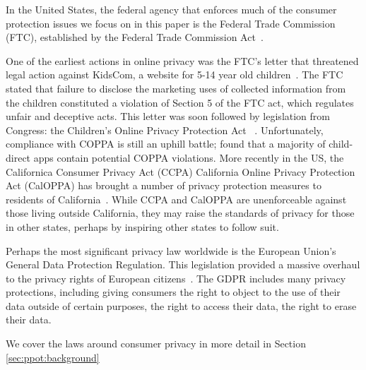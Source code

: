 In the United States, the federal agency that enforces much of the consumer protection issues we focus on in this paper is the Federal Trade Commission (FTC), established by the Federal Trade Commission Act~\cite{ftcact}.

One of the earliest actions in online privacy was the FTC's letter that threatened legal action against KidsCom, a website for 5-14 year old children~\cite{ftc1997principles}. The FTC stated that failure to disclose the marketing uses of collected information from the children constituted a violation of Section 5 of the FTC act, which regulates unfair and deceptive acts. This letter was soon followed by legislation from Congress: the Children's Online Privacy Protection Act ~\cite{coppa}. Unfortunately, compliance with COPPA is still an uphill battle; \citet{reyes2018won} found that a majority of child-direct apps contain potential COPPA violations. More recently in the US, the Californica Consumer Privacy Act (CCPA) California Online Privacy Protection Act (CalOPPA) has brought a number of privacy protection measures to residents of California~\cite{caloppa}. While CCPA and CalOPPA are unenforceable against those living outside California, they may raise the standards of privacy for those in other states, perhaps by inspiring other states to follow suit.

Perhaps the most significant privacy law worldwide is the European Union's General Data Protection Regulation. This legislation provided a massive overhaul to the privacy rights of European citizens~\cite{gdpr,hoofnagle2019european}. The GDPR includes many privacy protections, including giving consumers the right to object to the use of their data outside of certain purposes, the right to access their data, the right to erase their data.

We cover the laws around consumer privacy in more detail in Section \ref{sec:ppot:background}

    



